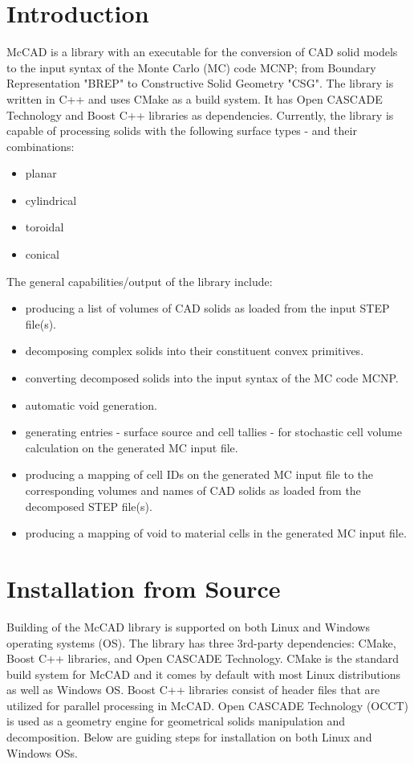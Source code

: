 \documentclass[12pt, a4paper, titlepage]{article}
\begin{document}
\section{Introduction} \label{sec:Introduction}
McCAD is a library with an executable for the conversion of CAD solid models to the input syntax of the Monte Carlo (MC) code MCNP; from Boundary Representation "BREP" to Constructive Solid Geometry "CSG". The library is written in C++ and uses CMake as a build system. It has Open CASCADE Technology and Boost C++ libraries as dependencies. Currently, the library is capable of processing solids with the following surface types - and their combinations:
\begin{itemize}
	\item planar
	\item cylindrical
	\item toroidal
         \item conical
\end{itemize}
The general capabilities/output of the library include:
\begin{itemize}
	\item producing a list of volumes of CAD solids as loaded from the input STEP file(s).
	\item decomposing complex solids into their constituent convex primitives.
	\item converting decomposed solids into the input syntax of the MC code MCNP.
	\item automatic void generation.
	\item generating entries - surface source and cell tallies - for stochastic cell volume calculation on the generated MC input file.
	\item producing a mapping of cell IDs on the generated MC input file to the corresponding volumes and names of CAD solids as loaded from the decomposed STEP file(s).
	\item producing a mapping of void to material cells in the generated MC input file.
\end{itemize}

\section{Installation from Source} \label{sec:Installation from Source}
Building of the McCAD library is supported on both Linux and Windows operating systems (OS). The library has three 3rd-party dependencies: CMake, Boost C++ libraries, and Open CASCADE Technology. CMake is the standard build system for McCAD and it comes by default with most Linux distributions as well as Windows OS. Boost C++ libraries consist of header files that are utilized for parallel processing in McCAD. Open CASCADE Technology (OCCT) is used as a geometry engine for geometrical solids manipulation and decomposition. Below are guiding steps for installation on both Linux and Windows OSs. 
\end{document}
